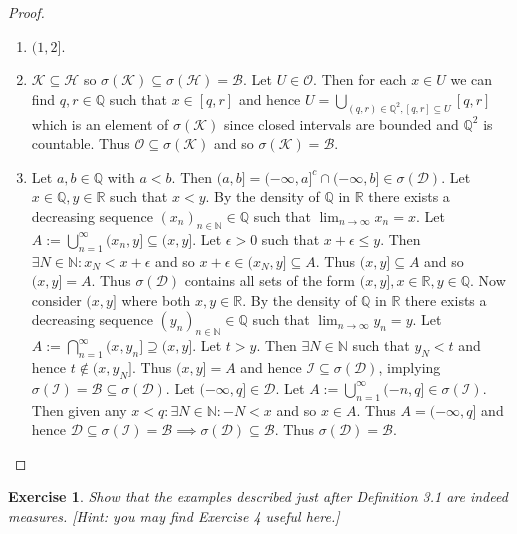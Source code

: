 \documentclass{article}
\newtheorem{exercise}[theorem]{Exercise}
\begin{document}
\begin{proof}
\begin{enumerate}
    \item $(1,2]$.
    \item $\mathcal{K}\subseteq\mathcal{H}$ so $\sigma(\mathcal{K})\subseteq\sigma(\mathcal{H})=\mathcal{B}$. Let $U\in\mathcal{O}$. Then for each $x\in U$ we can find $q,r\in\mathbb{Q}$ such that $x\in[q,r]$ and hence $U=\bigcup_{(q,r)\in\mathbb{Q}^2,[q,r]\subseteq U}[q,r]$ which is an element of $\sigma(\mathcal{K})$ since closed intervals are bounded and $\mathbb{Q}^2$ is countable. Thus $\mathcal{O}\subseteq\sigma(\mathcal{K})$ and so $\sigma(\mathcal{K})=\mathcal{B}$.
    \item Let $a,b\in\mathbb{Q}$ with $a< b$. Then $(a,b]=(-\infty,a]^c\cap(-\infty,b]\in\sigma(\mathcal{D})$. Let $x\in\mathbb{Q},y\in\mathbb{R}$ such that $x<y$. By the density of $\mathbb{Q}$ in $\mathbb{R}$ there exists a decreasing sequence $(x_n)_{n\in\mathbb{N}}\in\mathbb{Q}$ such that $\lim_{n\to\infty}x_n=x$. Let $A:=\bigcup_{n=1}^\infty(x_n,y]\subseteq(x,y]$. Let $\epsilon>0$ such that $x+\epsilon\leq y$. Then $\exists N\in\mathbb{N}:x_N<x+\epsilon$ and so $x+\epsilon\in(x_N,y]\subseteq A$. Thus $(x,y]\subseteq A$ and so $(x,y]=A$. Thus $\sigma(\mathcal{D})$ contains all sets of the form $(x,y],x\in\mathbb{R},y\in\mathbb{Q}$. Now consider $(x,y]$ where both $x,y\in\mathbb{R}$. By the density of $\mathbb{Q}$ in $\mathbb{R}$ there exists a decreasing sequence $(y_n)_{n\in\mathbb{N}}\in\mathbb{Q}$ such that $\lim_{n\to\infty}y_n=y$. Let $A:=\bigcap_{n=1}^\infty(x,y_n]\supseteq(x,y]$. Let $t>y$. Then $\exists N\in\mathbb{N}$ such that $y_N<t$ and hence $t\not\in(x,y_N]$. Thus $(x,y]=A$ and hence $\mathcal{I}\subseteq\sigma(\mathcal{D})$, implying $\sigma(\mathcal{I})=\mathcal{B}\subseteq\sigma(\mathcal{D})$. Let $(-\infty,q]\in\mathcal{D}$. Let $A:=\bigcup_{n=1}^\infty(-n,q]\in\sigma(\mathcal{I})$. Then given any $x<q:\exists N\in\mathbb{N}:-N<x$ and so $x\in A$. Thus $A=(-\infty,q]$ and hence $\mathcal{D}\subseteq\sigma(\mathcal{I})=\mathcal{B}\implies\sigma(\mathcal{D})\subseteq\mathcal{B}$. Thus $\sigma(\mathcal{D})=\mathcal{B}$.
\end{enumerate}
\end{proof}
\begin{exercise}
    Show that the examples described just after Definition 3.1 are indeed measures. 
    [\textit{Hint: you may find Exercise 4 useful here.}]
\end{exercise}
\end{document}

